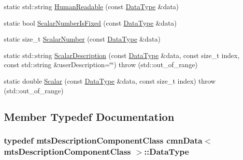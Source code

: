 \begin{DoxyCompactItemize}
\item 
static std\+::string \hyperlink{classcmn_data_3_01mts_description_component_class_01_4_a0f82cf0bef46e7576ddbf6254109578b}{Human\+Readable} (const \hyperlink{classcmn_data_3_01mts_description_component_class_01_4_a63c14a01f80b214ab860f6a0e04afa31}{Data\+Type} \&data)
\item 
static bool \hyperlink{classcmn_data_3_01mts_description_component_class_01_4_a7b79286a44364679256b71c049cfa765}{Scalar\+Number\+Is\+Fixed} (const \hyperlink{classcmn_data_3_01mts_description_component_class_01_4_a63c14a01f80b214ab860f6a0e04afa31}{Data\+Type} \&data)
\item 
static size\+\_\+t \hyperlink{classcmn_data_3_01mts_description_component_class_01_4_a1b43303d994e4f189d903c96b202e4a2}{Scalar\+Number} (const \hyperlink{classcmn_data_3_01mts_description_component_class_01_4_a63c14a01f80b214ab860f6a0e04afa31}{Data\+Type} \&data)
\item 
static std\+::string \hyperlink{classcmn_data_3_01mts_description_component_class_01_4_acc2f998a973fdb9aa86eec58dc1d69a6}{Scalar\+Description} (const \hyperlink{classcmn_data_3_01mts_description_component_class_01_4_a63c14a01f80b214ab860f6a0e04afa31}{Data\+Type} \&data, const size\+\_\+t index, const std\+::string \&user\+Description=\char`\"{}\char`\"{})  throw (std\+::out\+\_\+of\+\_\+range)
\item 
static double \hyperlink{classcmn_data_3_01mts_description_component_class_01_4_a3483a7957f264d2b34db053de3466a02}{Scalar} (const \hyperlink{classcmn_data_3_01mts_description_component_class_01_4_a63c14a01f80b214ab860f6a0e04afa31}{Data\+Type} \&data, const size\+\_\+t index)  throw (std\+::out\+\_\+of\+\_\+range)
\end{DoxyCompactItemize}


\subsection{Member Typedef Documentation}
\hypertarget{classcmn_data_3_01mts_description_component_class_01_4_a63c14a01f80b214ab860f6a0e04afa31}{}
\subsubsection[{Data\+Type}]{\setlength{\rightskip}{0pt plus 5cm}typedef {\bf mts\+Description\+Component\+Class} {\bf cmn\+Data}$<$ {\bf mts\+Description\+Component\+Class} $>$\+::{\bf Data\+Type}}\label{classcmn_data_3_01mts_description_component_class_01_4_a63c14a01f80b214ab860f6a0e04afa31}


